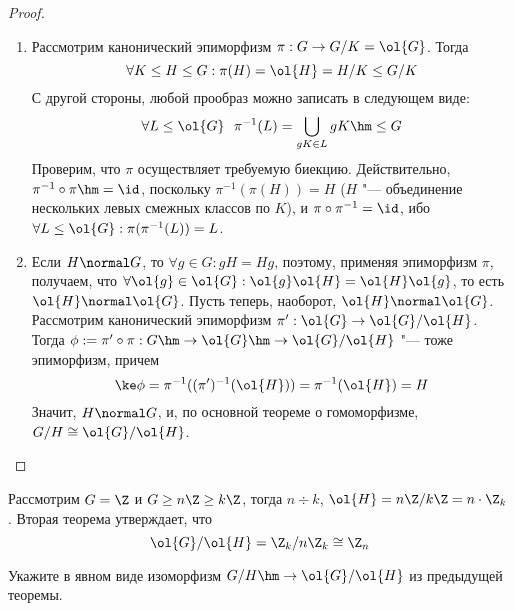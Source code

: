 \begin{proof}~
	\begin{enumerate}
		\item Рассмотрим канонический эпиморфизм $\pi: G \to G / K = \ol{G}$. Тогда
		\[
			\forall K \le H \le G: \pi(H) =\ol{H} = H / K \le G / K
		\]
		С другой стороны, любой прообраз можно записать в следующем виде:
		\[
			\forall L \le \ol{G}\ \ \pi^{-1}(L) = \bigcup_{gK \in L}gK \hm\le G
		\]
		Проверим, что $\pi$ осуществляет требуемую биекцию. Действительно, $\pi^{-1}\circ\pi \hm= \id$, поскольку $\pi^{-1}(\pi(H)) = H$ ($H$ "--- объединение нескольких левых смежных классов по $K$), и $\pi\circ\pi^{-1} = \id$, ибо $\forall L \le \ol{G}: \pi(\pi^{-1}(L)) = L$.
		
		\item Если $H \normal G$, то $\forall g \in G: gH = Hg$, поэтому, применяя эпиморфизм $\pi$, получаем, что $\forall \ol{g} \in \ol{G}: \ol{g}\ol{H} = \ol{H}\ol{g}$, то есть $\ol{H} \normal \ol{G}$. Пусть теперь, наоборот, $\ol{H} \normal \ol{G}$. Рассмотрим канонический эпиморфизм $\pi': \ol{G} \to \ol{G} / \ol{H}$. Тогда $\phi := \pi'\circ\pi: G \hm\to \ol{G} \hm\to \ol{G} / \ol{H}$ "--- тоже эпиморфизм, причем
		\[
			\ke \phi = \pi^{-1}((\pi')^{-1}(\ol{H})) = \pi^{-1}(\ol{H}) = H
		\]
		Значит, $H \normal G$, и, по основной теореме о гомоморфизме, $G / H \cong \ol{G} / \ol{H}$.
	\end{enumerate}
\end{proof}

\begin{example}
	Рассмотрим $G = \Z$ и $G \ge n\Z \ge k\Z$, тогда $n \div k$, $\ol{H} = n\Z / k\Z = n \cdot \Z_k$. Вторая теорема утверждает, что
	\[
		\ol{G} / \ol{H} = \Z_k / n\Z_k \cong \Z_n
	\]
\end{example}

\begin{exercise}
	Укажите в явном виде изоморфизм $G / H \hm\to \ol{G} / \ol{H}$ из предыдущей теоремы.
\end{exercise}